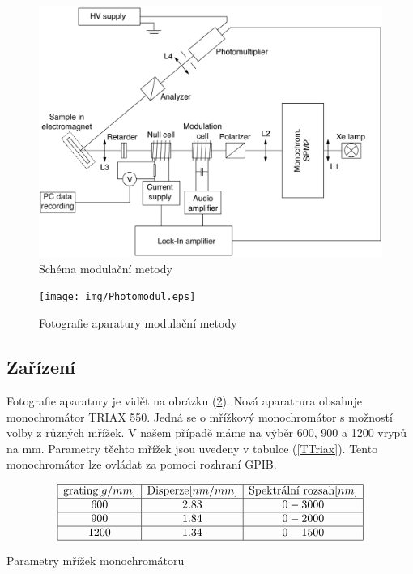 \begin{figure}
    \begin{center}
    \includegraphics[width=5in]{img/MO_setup.eps}
    \end{center}
    \caption{Schéma modulační metody}
    \label{Schema modul}
\end{figure}

\begin{figure}
    \begin{center}
    \texttt{[image: img/Photomodul.eps]}
    \end{center}
    \caption{Fotografie aparatury modulační metody}
    \label{Photo modul}
\end{figure}

\subsection{Zařízení}
Fotografie aparatury je vidět na obrázku (\ref{Photo modul}). Nová aparatrura obsahuje monochromátor TRIAX 550. Jedná se o mřížkový monochromátor s možností volby z různých mřížek. V našem případě máme na výběr 600, 900 a 1200 vrypů na mm. Parametry těchto mřížek jsou uvedeny v tabulce (\ref{TTriax}). Tento monochromátor lze ovládat za pomoci rozhraní GPIB. 
\begin{table}
$$
\begin{array}{|c|c|c|}
\hline
\mbox{grating} [g/mm]&  \mbox{Disperze} [nm/mm]&    \mbox{Spektrální rozsah} [nm] \\ \hline
600&    2.83&   0 - 3000 \\ \hline
900&    1.84&   0 - 2000 \\ \hline
1200&   1.34&   0 - 1500 \\ \hline
\end{array}
$$
\caption{Parametry mřížek monochromátoru}
\label{TTriax}
\end{table}

